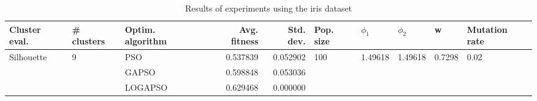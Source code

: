 \begin{table}
\centering
\caption{Results of experiments using the iris dataset}
\begin{tabular}{lllrrlllll}
\toprule
              Cluster eval. &        \# clusters & Optim. algorithm &  Avg. fitness &  Std. dev. &            Pop. size &               $\phi_{1}$ &               $\phi_{2}$ &                       w &         Mutation rate \\
\midrule
\multirow{3}{*}{Silhouette} & \multirow{3}{*}{9} &              PSO &      0.537839 &   0.052902 & \multirow{3}{*}{100} & \multirow{3}{*}{1.49618} & \multirow{3}{*}{1.49618} & \multirow{3}{*}{0.7298} & \multirow{3}{*}{0.02} \\
                            &                    &            GAPSO &      0.598848 &   0.053036 &                      &                          &                          &                         &                       \\
                            &                    &          LOGAPSO &      0.629468 &   0.000000 &                      &                          &                          &                         &                       \\
\bottomrule
\end{tabular}
\end{table}
